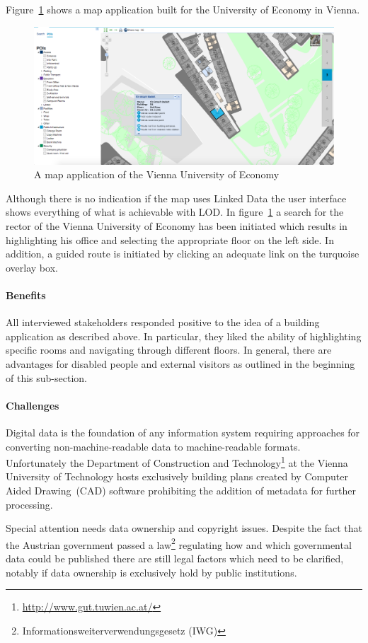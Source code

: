 \documentclass{article}
\begin{document}
Figure~\ref{fig:um-map-app} shows a map application built for the University of Economy in Vienna. 
\begin{figure}[H]
	\centering \includegraphics*[width=.8\columnwidth]{map_wu_wien.png}
	\caption{A map application of the Vienna University of Economy}
	\label{fig:um-map-app}
\end{figure}
Although there is no indication if the map uses Linked Data the user interface shows everything of what is achievable with LOD. 
In figure~\ref{fig:um-map-app} a search for the rector of the Vienna University of Economy has been initiated which results in highlighting his office and selecting the appropriate floor on the left side. In addition, a guided route is initiated by clicking an adequate link on the turquoise overlay box. 
\paragraph{Benefits}
All interviewed stakeholders responded positive to the idea of a building application as described above. In particular, they liked the ability of highlighting specific rooms and navigating through different floors. In general, there are advantages for disabled people and external visitors as outlined in the beginning of this sub-section. 

\paragraph{Challenges}
Digital data is the foundation of any information system requiring approaches for converting non-machine-readable data to machine-readable formats. Unfortunately the Department of Construction and Technology\footnote{\url{http://www.gut.tuwien.ac.at/}} at the Vienna University of Technology hosts exclusively building plans created by Computer Aided Drawing~(CAD) software prohibiting the addition of metadata for further processing. 

Special attention needs data ownership and copyright issues. Despite the fact that the Austrian government passed a law\footnote{Informationsweiterverwendungsgesetz (IWG)} regulating how and which governmental data could be published there are still legal factors which need to be clarified, notably if data ownership is exclusively hold by public institutions. 
\end{document}
